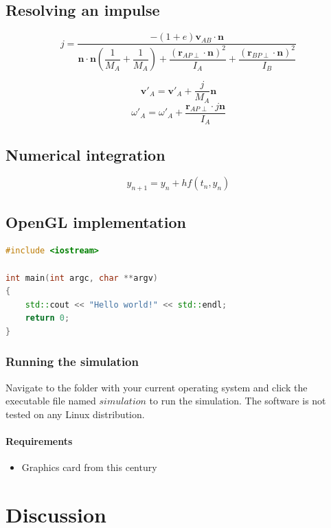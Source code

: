 \documentclass[a4paper,12pt]{report}
\begin{document}
\lipsum[0-2]

\section{Resolving an impulse}
\begin{equation}
j = \dfrac{ -(1+e) \mathbf v_{AB} \cdot \mathbf n }{
    \mathbf n \cdot \mathbf n ( \dfrac{1}{M_{A}} + \dfrac{1}{M_{A}} )
    + \dfrac{ (\mathbf r_{AP\perp} \cdot \mathbf n)^2}{I_{A} }
    + \dfrac{ (\mathbf r_{BP\perp} \cdot \mathbf n)^2}{I_{B} } }
\label{e1}
\end{equation}

\lipsum[0-1]

\begin{equation}
\mathbf v'_{A}=\mathbf v'_{A}+\frac{j}{M_{A}}\mathbf n
\label{e2}
\end{equation}
\begin{equation}
\omega'_{A}=\omega'_{A}+\frac{\mathbf r_{AP\perp}\cdot j\mathbf n}{I_{A}}
\label{e3}
\end{equation}

\lipsum[0-1]

\section{Numerical integration}

\lipsum[0-1]

\begin{equation}
y_{n+1}=y_{n}+hf(t_n, y_n)
\label{e4}
\end{equation}

\section{OpenGL implementation}

\lipsum[0-1]

\begin{lstlisting}[caption={This is a Hello World application written in C++.}, language={C++}]
#include <iostream>

int main(int argc, char **argv)
{
    std::cout << "Hello world!" << std::endl;
    return 0;
}
\end{lstlisting}

\subsection{Running the simulation}
Navigate to the folder with your current operating system and click the executable file named $simulation$ to run the simulation. The software is not tested on any Linux distribution.

\subsubsection{Requirements}
\begin{itemize}
    \item Graphics card from this century
\end{itemize}


\chapter{Discussion}

\lipsum[0-1]






\end{document}
